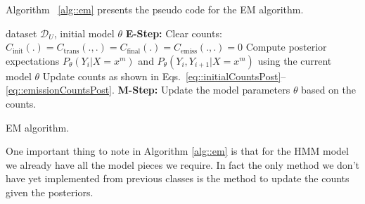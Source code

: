 Algorithm ~\ref{alg::em} presents the pseudo code for the EM
algorithm. 

\begin{algorithm}
\begin{algorithmic}[1]
   dataset $\mathcal{D}_{U}$, initial model $\theta$
    	  \STATE
    	  \STATE \textbf{E-Step:}
      \STATE Clear counts: $C_{\mathrm{init}}(.) = C_{\mathrm{trans}}(.,.) = C_{\mathrm{final}}(.) = C_{\mathrm{emiss}}(.,.) = 0$
      	\STATE Compute posterior expectations $P_{\theta}(Y_i|X=x^m)$ and $P_{\theta}(Y_i,Y_{i+1}|X=x^m)$ using the current model $\theta$
      \STATE Update counts as shown in Eqs.~\ref{eq::initialCountsPost}--\ref{eq::emissionCountsPost}.
      \ENDFOR
    	  \STATE
      \STATE \textbf{M-Step:}
         \STATE Update the model parameters $\theta$ based on the counts.
    \ENDFOR
\end{algorithmic}    
\caption[EM algorithm]{\label{alg::em}  EM algorithm.} 
\end{algorithm}


One important thing to note in Algorithm \ref{alg::em} is that for the
HMM model we already have all the model pieces we require. In fact
the only method we don't have yet implemented from previous classes is
the method to update the counts given the posteriors. 

